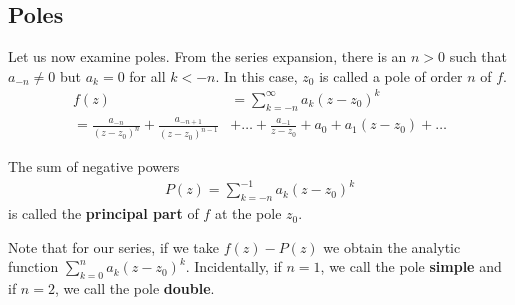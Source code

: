 \subsection{Poles}
Let us now examine poles. From the series expansion, there is an $n>0$ such that $a_{-n}\neq0$ but $a_k=0$ for all $k<-n$. In this case, $z_0$ is called a pole of order $n$ of $f$.
\begin{align*}
    f(z)&=\sum_{k=-n}^\infty a_k(z-z_0)^k\\
    =\frac{a_{-n}}{(z-z_0)^n}+\frac{a_{-n+1}}{(z-z_0)^{n-1}}&+\dots+\frac{a_{-1}}{z-z_0}+a_0+a_1(z-z_0)+\dots
\end{align*}
\begin{definition}
    The sum of negative powers
    \begin{align*}
        P(z)=\sum_{k=-n}^{-1} a_k(z-z_0)^k
    \end{align*}
    is called the \textbf{principal part} of $f$ at the pole $z_0$.
\end{definition}
\begin{remark}
Note that for our series, if we take $f(z)-P(z)$ we obtain the analytic function $\sum_{k=0}^na_k(z-z_0)^k$.
Incidentally, if $n=1$, we call the pole \textbf{simple} and if $n=2$, we call the pole \textbf{double}.
\end{remark}

